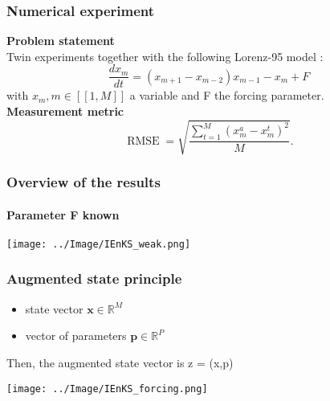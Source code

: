 \documentclass{beamer}
\begin{document}
\begin{frame}
\frametitle{Numerical experiment}
\textbf{Problem statement} \\
Twin experiments together with the following Lorenz-95 model : \\
\begin{equation*}
\frac{dx_m}{dt} = (x_{m+1}-x_{m-2})x_{m-1} - x_m + F
\end{equation*}
with $x_m, m \in [\![1,M]\!]$ a variable and F the forcing parameter. \\

\textbf{Measurement metric}
$$\operatorname{RMSE}= \sqrt{\frac{\sum_{t=1}^M (x_{m}^{a} - x_{m}^{t})^2}{M}}.$$
\end{frame}
\begin{frame}
\frametitle{Overview of the results}
\framesubtitle{Parameter F known}
\texttt{[image: ../Image/IEnKS\_weak.png]}

\end{frame}

\begin{frame}
\frametitle{Augmented state principle}
\begin{itemize}
\item state vector $\textbf{x} \in \mathbb{R}^M$
\item vector of parameters $\textbf{p} \in \mathbb{R}^P$
\end{itemize}

Then, the augmented state vector is z = (x,p) 
\begin{center}
\texttt{[image: ../Image/IEnKS\_forcing.png]}
\end{center}
\end{frame}
\end{document}
